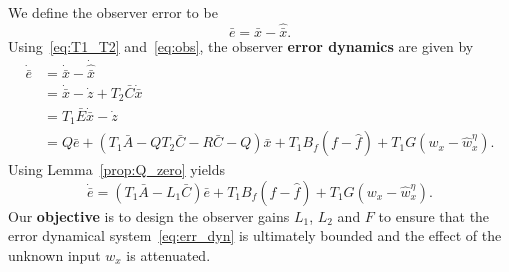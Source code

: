 \documentclass[times, doublespace]{rncauth}
\newcommand{\hb}[1]{\hat{\bar{#1}}}
\begin{document}
We define the observer error to be $$\bar e = \bar x- \hb x.$$ Using~\eqref{eq:T1_T2} and~\eqref{eq:obs}, the observer \textbf{error dynamics} are given by
\begin{align*}
\dot{\bar e} &= \dot{\bar x} - \dot{\hb x}\\
&= \dot{\bar x} - \dot z + T_2 \bar C \dot{\bar x}\\
&= T_1\bar E \dot{\bar x} - \dot{z}\\
&= Q\bar e + (T_1 \bar A - Q T_2 \bar C - R\bar C - Q)\bar x +T_1 B_f (f-\hat f) + T_1G (w_x-\hat w^\eta_x).
\end{align*}
Using Lemma~\ref{prop:Q_zero} yields
\begin{equation}\label{eq:err_dyn}
\dot{\bar e} = (T_1 \bar A -L_1\bar C) \bar e + T_1 B_f (f-\hat f) + T_1G (w_x-\hat w^\eta_x).
\end{equation}
Our \textbf{objective} is to design the observer gains $L_1$, $L_2$ and $F$ to ensure that the error dynamical system~\eqref{eq:err_dyn} is ultimately bounded and the effect of the unknown input $w_x$ is attenuated.
\end{document}
